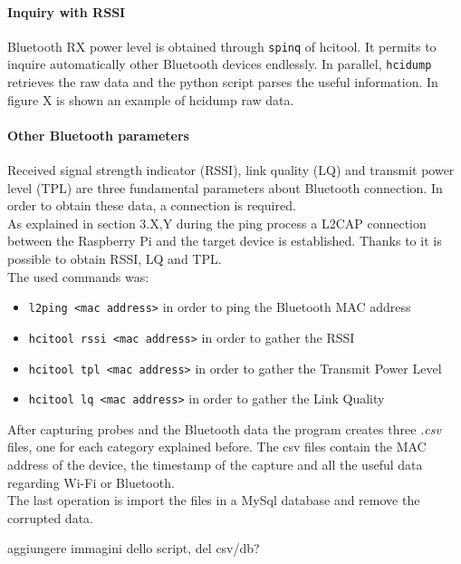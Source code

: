 \paragraph{Inquiry with RSSI}
Bluetooth RX power level is obtained through \texttt{spinq} of hcitool. It permits to inquire automatically other Bluetooth devices endlessly. In parallel, \texttt{hcidump} retrieves the raw data and the python script parses the useful information. In figure X is shown an example of hcidump raw data.

\paragraph{Other Bluetooth parameters}
Received signal strength indicator (RSSI), link quality (LQ) and transmit power level (TPL) are three fundamental parameters about Bluetooth connection. In order to obtain these data, a connection is required.\\
As explained in section 3.X,Y during the ping process a L2CAP connection between the Raspberry Pi and the target device is established. Thanks to it is possible to obtain  RSSI, LQ and TPL.\\
The used commands was:
\begin{itemize}
\item \texttt{l2ping \textless mac address\textgreater} in order to ping the Bluetooth MAC address
\item \texttt{hcitool rssi  \textless mac address\textgreater} in order to gather the RSSI
\item \texttt{hcitool tpl  \textless mac address\textgreater} in order to gather the Transmit Power Level
\item \texttt{hcitool lq  \textless mac address\textgreater} in order to gather the Link Quality
\end{itemize}
After capturing probes and the Bluetooth data the program creates three \textit{.csv} files, one for each category explained before. The csv files contain the MAC address of the device, the timestamp of the capture and all the useful data regarding Wi-Fi or Bluetooth.\\
The last operation is import the files in a MySql database and remove the corrupted data.

aggiungere immagini dello script, del csv/db?